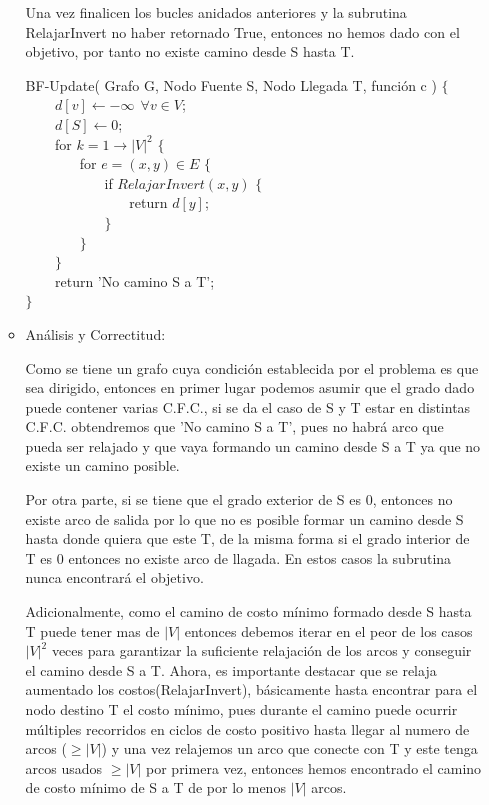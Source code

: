 \documentclass[a4paper,12pt]{article}
\begin{document}
\begin{enumerate}
\begin{itemize}
Una vez finalicen los bucles anidados anteriores y la subrutina RelajarInvert no haber retornado True, entonces no hemos dado con el objetivo, por tanto no existe camino desde S hasta T.

BF-Update( Grafo G, Nodo Fuente S, Nodo Llegada T, función c ) $\{$\\
$~~~~~~~~$ $d[v] \leftarrow -\infty ~~ \forall v\in V$;\\
$~~~~~~~~$ $d[S] \leftarrow 0$;\\
$~~~~~~~~$ for $k = 1 \to |V|^2$ $\{$\\
$~~~~~~~~~~~~~~~~$ for $e=(x,y)\in E$ $\{$\\ 
$~~~~~~~~~~~~~~~~~~~~~~~~$ if $RelajarInvert(x,y)$ $\{$\\
$~~~~~~~~~~~~~~~~~~~~~~~~~~~~~~~~$ return $d[y]$;\\
$~~~~~~~~~~~~~~~~~~~~~~~~$ $\}$\\
$~~~~~~~~~~~~~~~~$ $\}$ \\
$~~~~~~~~$ $\}$\\
$~~~~~~~~$ return 'No camino S a T';\\
$\}$ \\

\item Análisis y Correctitud:

Como se tiene un grafo cuya condición establecida por el problema es que sea dirigido, entonces en primer lugar podemos asumir que el grado dado puede contener varias C.F.C., si se da el caso de S y T estar en distintas C.F.C. obtendremos que 'No camino S a T', pues no habrá arco que pueda ser relajado y que vaya formando un camino desde S a T ya que no existe un camino posible. 

Por otra parte, si se tiene que el grado exterior de S es 0, entonces no existe arco de salida por lo que no es posible formar un camino desde S hasta donde quiera que este T, de la misma forma si el grado interior de T es 0 entonces no existe arco de llagada. En estos casos la subrutina nunca encontrará el objetivo. 

Adicionalmente, como el camino de costo mínimo formado desde S hasta T puede tener mas de $|V|$ entonces debemos iterar en el peor de los casos $|V|^2$ veces para garantizar la suficiente relajación de los arcos y conseguir el camino desde S a T. Ahora, es importante destacar que se relaja aumentado los costos(RelajarInvert), básicamente hasta encontrar para el nodo destino T el costo mínimo, pues durante el camino puede ocurrir múltiples recorridos en ciclos de costo positivo hasta llegar al numero de arcos ($\geq |V|$) y una vez relajemos un arco que conecte con T y este tenga arcos usados $\geq |V|$ por primera vez, entonces hemos encontrado el camino de costo mínimo de S a T de por lo menos $|V|$ arcos. \\


\end{itemize}
\end{enumerate}
\end{document}
